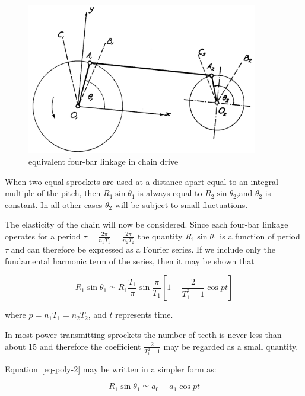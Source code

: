 \begin{figure}[th!]
  \centering
  \includegraphics[width=0.9\textwidth]{figs/fig1.png}
  \caption{equivalent four-bar linkage in chain drive}
  \label{fig-poly-1}
\end{figure}

When two equal sprockets are used at a distance apart equal to an integral multiple of the pitch, then $R_1\sin\theta_1$ is always equal to $R_2\sin\theta_2$,and $\dot{\theta}_2$ is constant. In all other cases $\dot{\theta}_2$ will be subject to small fluctuations.

The elasticity of the chain will now be considered. Since each four-bar linkage operates for a period $\tau=\frac{2\pi}{n_1T_1}=\frac{2\pi}{n_2T_2}$ the quantity $R_1\sin\theta_1$ is a function of period $\tau$ and can therefore be expressed as a Fourier series. If we include only the fundamental harmonic term of the series, then it may be shown that

\begin{equation}
  R_1\sin\theta_1 \simeq R_1\frac{T_1}{\pi}\sin\frac{\pi}{T_1}\left[1-\frac{2}{T_1^2-1}\cos pt\right]
  \label{eq-poly-2}
\end{equation}

where $p=n_1T_1=n_2T_2$, and $t$ represents time.

In most power transmitting sprockets the number of teeth is never less than about 15 and therefore the coefficient $\frac{2}{T_1^2-1}$ may be regarded as a small quantity.

Equation~\ref{eq-poly-2} may be written in a simpler form as:

\begin{equation}
  R_1\sin\theta_1 \simeq a_0 + a_1\cos pt
\end{equation}

